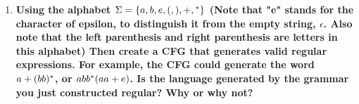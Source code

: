 \begin{enumerate}
\newpage
\item \textbf{Using the alphabet $\Sigma = \{a, b, e, (, ), +, {}^\ast\}$
(Note that "e" stands for the character of epsilon, to distinguish it from
the empty string, $\epsilon$. Also note that the left parenthesis and right
parenthesis are letters in this alphabet) Then create a CFG that generates
valid regular expressions. For example, the CFG could generate the word
$a+(bb){}^\ast$, or $abb{}^\ast(aa+e)$.  Is the language generated by the
grammar you just constructed regular? Why or why not?}

\end{enumerate}


